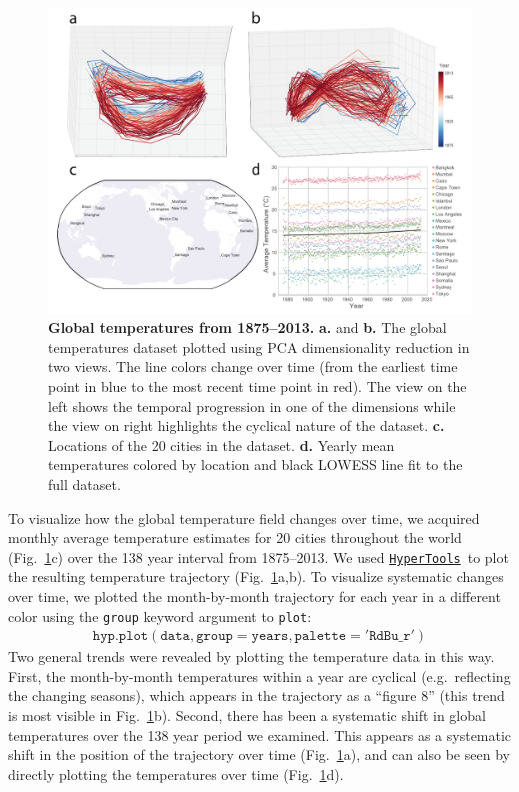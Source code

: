 \documentclass[12pt,letterpaper]{article}
\newcommand{\hypertools}{\href{https://github.com/ContextLab/hypertools}{\texttt{HyperTools}}}
\begin{document}
\begin{figure}[tbp]
\centering
\includegraphics[width=1\textwidth]{global_warming}
\caption{\textbf{Global temperatures from 1875--2013.}  \textbf{a.} and \textbf{b.} The global temperatures dataset plotted using PCA dimensionality reduction in two views. The line colors change over time (from the earliest time point in blue to the most recent time point in red).  The view on the left shows the temporal progression in one of the dimensions while the view on right highlights the cyclical nature of the dataset. \textbf{c.} Locations of the 20 cities in the dataset. \textbf{d.} Yearly mean temperatures colored by location and black LOWESS line fit to the full dataset.} \label{fig:globalwarming}
\end{figure}

To visualize how the global temperature field changes over time, we acquired monthly average temperature estimates for 20 cities throughout the world (Fig.~\ref{fig:globalwarming}c) over the 138 year interval from 1875--2013.  We used \hypertools~to plot the resulting temperature trajectory (Fig.~\ref{fig:globalwarming}a,b).  To visualize systematic changes over time, we plotted the month-by-month trajectory for each year in a different color using the \texttt{group} keyword argument to \texttt{plot}:
\begin{align}
\mathtt{hyp.plot(data, group=years, palette='RdBu\_r')}
\end{align}
Two general trends were revealed by plotting the temperature data in this way.  First, the month-by-month temperatures within a year are cyclical (e.g.\ reflecting the changing seasons), which appears in the trajectory as a ``figure 8'' (this trend is most visible in Fig.~\ref{fig:globalwarming}b).
Second, there has been a systematic shift in global temperatures over the 138 year period we examined.  This appears as a systematic shift in the position of the trajectory over time (Fig.~\ref{fig:globalwarming}a), and can also be seen by directly plotting the temperatures over time (Fig.~\ref{fig:globalwarming}d).
\end{document}
